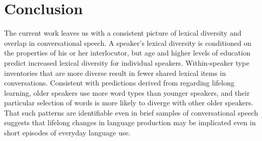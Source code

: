 \documentclass[10pt,letterpaper]{article}
\begin{document}
\section{Conclusion}
The current work leaves us with a consistent picture of lexical diversity and overlap in conversational speech.
A speaker's lexical diversity is conditioned on the properties of his or her interlocutor, but age and higher levels of education predict increased lexical diversity for individual speakers. 
Within-speaker type inventories that are more diverse result in fewer shared lexical items in conversations. Consistent with predictions derived from \citet{ramscarEtAl2014} regarding lifelong learning, older speakers use more word types than younger speakers, and their particular selection of words is more likely to diverge with other older speakers. That such patterns are identifiable even in brief samples of conversational speech suggests that lifelong changes in language production may be implicated even in short episodes of everyday language use.





\setlength{\bibleftmargin}{.125in}
\setlength{\bibindent}{-\bibleftmargin}

\def\thebibliography#1{\section*{References}
 \small
  \list
  {[\arabic{enumi}]}{\leftmargin \parindent
    \itemindent -\parindent
    \itemsep 0ex plus 1pt
    \parsep 0.1ex plus 1pt minus 1pt
    \usecounter{enumi}}
    \def\newblock{\hskip .11em plus .33em minus .07em}
    \sloppy\clubpenalty4000\widowpenalty4000
    \sfcode`\.=1000\relax}



\end{document}
